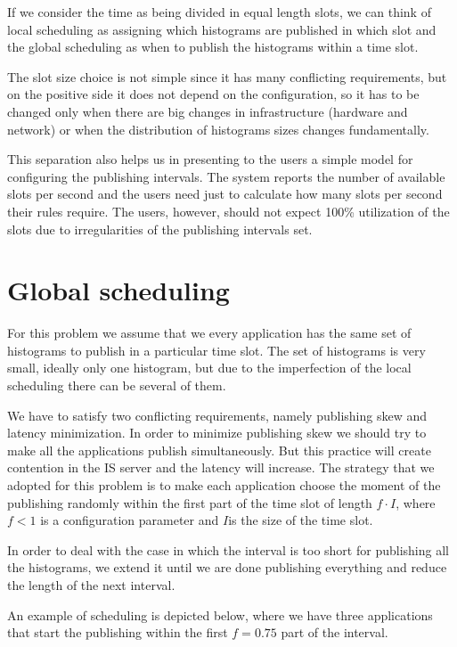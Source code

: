 If we consider the time as being divided in equal length slots, we can think of local scheduling as assigning which histograms are published in which slot and the global scheduling as when to publish the histograms within a time slot. 

The slot size choice is not simple since it has many conflicting requirements, but on the positive side it does not depend on the configuration, so it has to be changed only when there are big changes in infrastructure (hardware and network) or when the distribution of histograms sizes changes fundamentally.

This separation also helps us in presenting to the users a simple model for configuring the publishing intervals. The system reports the number of available slots per second and the users need just to calculate how many slots per second their rules require. The users, however, should not expect 100\% utilization of the slots due to irregularities of the publishing intervals set.

\section*{Global scheduling}

For this problem we assume that we every application has the same set of histograms to publish in a particular time slot. The set of histograms is very small, ideally only one histogram, but due to the imperfection of the local scheduling there can be several of them.

We have to satisfy two conflicting requirements, namely publishing skew and latency minimization. In order to minimize publishing skew we should try to make all the applications publish simultaneously. But this practice will create contention in the IS server and the latency will increase. 
The strategy that we adopted for this problem is to make each application choose the moment of the publishing randomly within the first part of the time slot of length $f\cdot I$, where $f<1$ is a configuration parameter and $I$is the size of the time slot.

In order to deal with the case in which the interval is too short for publishing all the histograms, we extend it until we are done publishing everything and reduce the length of the next interval.

An example of scheduling is depicted below, where we have three applications that start the publishing within the first $f=0.75$ part of the interval.

